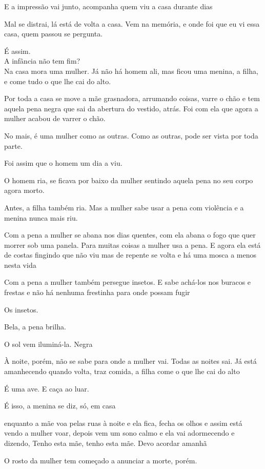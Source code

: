 E a impressão vai junto, acompanha quem viu a casa durante dias

Mal se distrai, lá está de volta a casa. Vem na memória, e onde foi que
eu vi essa casa, quem passou se pergunta.

É assim.\\

A infância não tem fim?\\

Na casa mora uma mulher. Já não há homem ali, mas ficou uma menina, a
filha, e come tudo o que lhe cai do alto.

Por toda a casa se move a mãe grasnadora, arrumando coisas, varre o chão
e tem aquela pena negra que sai da abertura do vestido, atrás. Foi com
ela que agora a mulher acabou de varrer o chão.

No mais, é uma mulher como as outras. Como as outras, pode ser vista por
toda parte.

Foi assim que o homem um dia a viu.

O homem ria, se ficava por baixo da mulher sentindo aquela pena no seu
corpo agora morto.

Antes, a filha também ria. Mas a mulher sabe usar a pena com violência e
a menina nunca mais riu.

Com a pena a mulher se abana nos dias quentes, com ela abana o fogo que
quer morrer sob uma panela. Para muitas coisas a mulher usa a pena. E
agora ela está de costas fingindo que não viu mas de repente se volta e
há uma mosca a menos nesta vida

Com a pena a mulher também persegue insetos. E sabe achá-los nos buracos
e frestas e não há nenhuma frestinha para onde possam fugir

Os insetos.

Bela, a pena brilha.

O sol vem iluminá-la. Negra

À noite, porém, não se sabe para onde a mulher vai. Todas as noites sai.
Já está amanhecendo quando volta, traz comida, a filha come o que lhe
cai do alto

É uma ave. E caça ao luar.

É isso, a menina se diz, só, em casa

enquanto a mãe voa pelas ruas à noite e ela fica, fecha os olhos e assim
está vendo a mulher voar, depois vem um sono calmo e ela vai adormecendo
e dizendo, Tenho esta mãe, tenho esta mãe. Devo acordar amanhã

O rosto da mulher tem começado a anunciar a morte, porém.

